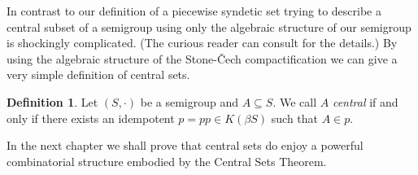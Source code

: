 \documentclass[12pt,showtrims]{memoir}
\theoremstyle{plain}
\theoremstyle{definition}
\newtheorem{defn}[thm]{Definition}
\begin{document}
In contrast to our definition of a piecewise syndetic set trying to describe a central subset of a semigroup using only the algebraic structure of our semigroup is shockingly complicated. 
(The curious reader can consult \cite[Section 14.5]{Hindman:1998fk} for the details.)
By using the algebraic structure of the Stone-\v{C}ech compactification we can give a very simple definition of central sets.

\begin{defn}
  Let $(S, \cdot)$ be a semigroup and $A \subseteq S$.
  We call $A$ \textsl{central} if and only if there exists an idempotent $p = pp \in K(\beta S)$ such that $A \in p$.
\end{defn}

In the next chapter we shall prove that central sets do enjoy a powerful combinatorial structure embodied by the Central Sets Theorem.


\theendnotes



\end{document}
